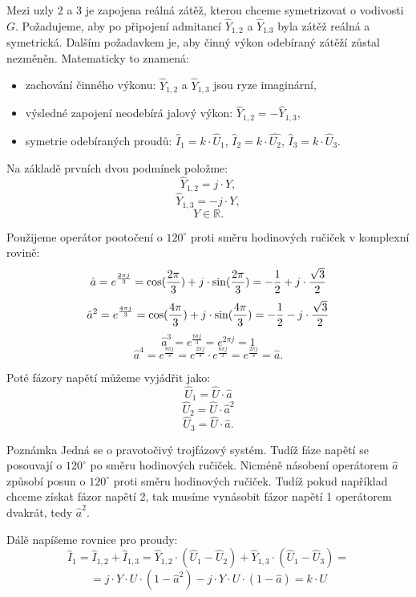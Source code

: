 \documentclass{article}
\begin{document}
Mezi uzly 2 a 3 je zapojena reálná zátěž, kterou chceme symetrizovat o vodivosti $G$. Požadujeme, aby po připojení admitancí $\hat{Y}_{1,2}$ a $\hat{Y}_{1.3}$ byla zátěž reálná a symetrická. Dalším požadavkem je, aby činný výkon odebíraný zátěží zůstal nezměněn. Matematicky to znamená:
\begin{itemize}
    \item zachování činného výkonu: $\hat{Y}_{1,2}$ a $\hat{Y}_{1,3}$ jsou ryze imaginární,
    \item výsledné zapojení neodebírá jalový výkon: $\hat{Y}_{1,2} = - \hat{Y}_{1,3}$,
    \item symetrie odebíraných proudů: $\hat{I}_1 = k \cdot \hat{U}_1$, $\hat{I}_2 = k \cdot \hat{U_2}$, $\hat{I}_3 = k \cdot \hat{U}_3$.
\end{itemize}

Na základě prvních dvou podmínek položme:
$$
    \hat{Y}_{1,2} = j \cdot Y,
$$
$$
    \hat{Y}_{1,3} = -j \cdot Y,
$$
$$
    Y \in \mathbb{R}.
$$

Použijeme operátor pootočení o $120^\circ$ proti směru hodinových ručiček v komplexní rovině:
$$
    \hat{a} = e^{\frac{2 \pi j}{3}} = \textrm{cos}(\frac{2 \pi}{3}) + j \cdot \textrm{sin}(\frac{2 \pi}{3}) = -\frac{1}{2} + j \cdot \frac{\sqrt{3}}{2}
$$
$$
    \hat{a}^2 = e^{\frac{4 \pi j}{3}} = \textrm{cos}(\frac{4 \pi}{3}) + j \cdot \textrm{sin}(\frac{4 \pi}{3}) = -\frac{1}{2} - j \cdot \frac{\sqrt{3}}{2}
$$
$$
    \hat{a}^3 = e^{\frac{6 \pi j}{3}} = e^{2 \pi j} = 1
$$
$$
    \hat{a}^4 = e^{\frac{8 \pi j}{3}} = e^{\frac{2 \pi j}{3}} \cdot e^{\frac{6 \pi j}{3}} = e^{\frac{2 \pi j}{3}} = \hat{a}.
$$

Poté fázory napětí můžeme vyjádřit jako:
$$
    \hat{U}_1 = \hat{U} \cdot \hat{a}
$$
$$
    \hat{U}_2 = \hat{U} \cdot \hat{a}^2
$$
$$
    \hat{U}_3 = \hat{U} \cdot \hat{a}.
$$

\begin{notebox}{Poznámka}
    Jedná se o pravotočivý trojfázový systém. Tudíž fáze napětí se posouvají o $120^\circ$ po směru hodinových ručiček. Nicméně násobení operátorem $\hat{a}$ způsobí posun o $120^\circ$ proti směru hodinových ručiček. Tudíž pokud například chceme získat fázor napětí 2, tak musíme vynásobit fázor napětí 1 operátorem dvakrát, tedy $\hat{a}^2$.
\end{notebox}

Dálě napíšeme rovnice pro proudy:
$$
    \hat{I}_1 = \hat{I}_{1,2} + \hat{I}_{1,3} = \hat{Y}_{1,2} \cdot \left( \hat{U}_1 - \hat{U}_2 \right) + \hat{Y}_{1,3} \cdot \left( \hat{U}_1 - \hat{U}_3 \right) =
$$
$$
    = j \cdot Y \cdot U \cdot \left( 1 - \hat{a}^2 \right) - j \cdot Y \cdot U \cdot \left( 1 - \hat{a} \right) = k \cdot U
$$
\end{document}
